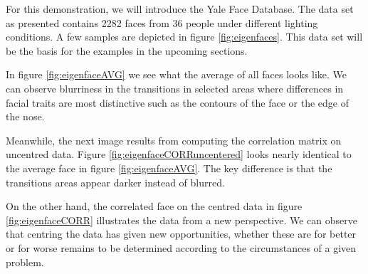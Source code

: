\begin{minipage}[h][120mm][t]{0.55\linewidth}

    \setlength{\parindent}{2em}

    \bigskip

    \noindent
    For this demonstration, we will introduce the Yale Face Database.
    The data set as presented contains 2282 faces from 36 people under different lighting conditions.
    A few samples are depicted in figure \ref{fig:eigenfaces}.
    This data set will be the basis for the examples in the upcoming sections.

    \bigskip

    In figure \ref{fig:eigenfaceAVG} we see what the average of all faces looks like.
    We can observe blurriness in the transitions in selected areas where differences in facial traits are most distinctive such as the contours of the face or the edge of the nose.

    \medskip

    Meanwhile, the next image results from computing the correlation matrix on uncentred data.
    Figure \ref{fig:eigenfaceCORRuncentered} looks nearly identical to the average face in figure \ref{fig:eigenfaceAVG}.
    The key difference is that the transitions areas appear darker instead of blurred.

    \medskip

    On the other hand, the correlated face on the centred data in figure \ref{fig:eigenfaceCORR} illustrates the data from a new perspective.
    We can observe that centring the data has given new opportunities, whether these are for better or for worse remains to be determined according to the circumstances of a given problem.


\end{minipage}%
